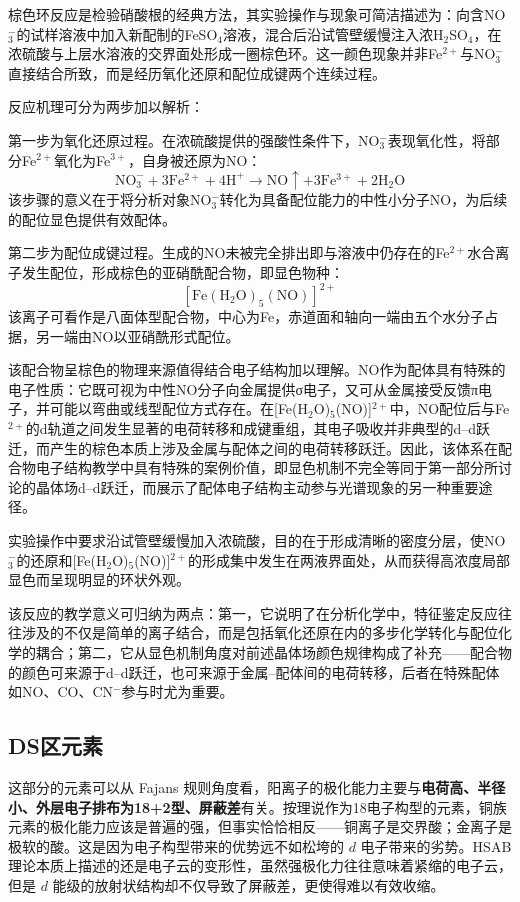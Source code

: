 \documentclass[UTF8]{ctexbook}
\begin{document}
棕色环反应是检验硝酸根的经典方法，其实验操作与现象可简洁描述为：向含NO$_3^-$的试样溶液中加入新配制的FeSO$_4$溶液，混合后沿试管壁缓慢注入浓H$_2$SO$_4$，在浓硫酸与上层水溶液的交界面处形成一圈棕色环。这一颜色现象并非Fe$^{2+}$与NO$_3^-$直接结合所致，而是经历氧化还原和配位成键两个连续过程。

反应机理可分为两步加以解析：

第一步为氧化还原过程。在浓硫酸提供的强酸性条件下，NO$_3^-$表现氧化性，将部分Fe$^{2+}$氧化为Fe$^{3+}$，自身被还原为NO：
\[
\mathrm{NO_3^- + 3Fe^{2+} + 4H^+ \rightarrow NO\uparrow + 3Fe^{3+} + 2H_2O}
\]
该步骤的意义在于将分析对象NO$_3^-$转化为具备配位能力的中性小分子NO，为后续的配位显色提供有效配体。

第二步为配位成键过程。生成的NO未被完全排出即与溶液中仍存在的Fe$^{2+}$水合离子发生配位，形成棕色的亚硝酰配合物，即显色物种：
\[
\mathrm{[Fe(H_2O)_5(NO)]^{2+}}
\]
该离子可看作是八面体型配合物，中心为Fe，赤道面和轴向一端由五个水分子占据，另一端由NO以亚硝酰形式配位。

该配合物呈棕色的物理来源值得结合电子结构加以理解。NO作为配体具有特殊的电子性质：它既可视为中性NO分子向金属提供σ电子，又可从金属接受反馈π电子，并可能以弯曲或线型配位方式存在。在[Fe(H$_2$O)$_5$(NO)]$^{2+}$中，NO配位后与Fe$^{2+}$的d轨道之间发生显著的电荷转移和成键重组，其电子吸收并非典型的d--d跃迁，而产生的棕色本质上涉及金属与配体之间的电荷转移跃迁。因此，该体系在配合物电子结构教学中具有特殊的案例价值，即显色机制不完全等同于第一部分所讨论的晶体场d--d跃迁，而展示了配体电子结构主动参与光谱现象的另一种重要途径。

实验操作中要求沿试管壁缓慢加入浓硫酸，目的在于形成清晰的密度分层，使NO$_3^-$的还原和[Fe(H$_2$O)$_5$(NO)]$^{2+}$的形成集中发生在两液界面处，从而获得高浓度局部显色而呈现明显的环状外观。

该反应的教学意义可归纳为两点：第一，它说明了在分析化学中，特征鉴定反应往往涉及的不仅是简单的离子结合，而是包括氧化还原在内的多步化学转化与配位化学的耦合；第二，它从显色机制角度对前述晶体场颜色规律构成了补充——配合物的颜色可来源于d--d跃迁，也可来源于金属--配体间的电荷转移，后者在特殊配体如NO、CO、CN$^-$参与时尤为重要。

\newpage

\subsection{DS区元素}

这部分的元素可以从 Fajans 规则角度看，阳离子的极化能力主要与\textbf{电荷高、半径小、外层电子排布为18+2型、屏蔽差}有关。按理说作为18电子构型的元素，铜族元素的极化能力应该是普遍的强，但事实恰恰相反——铜离子是交界酸；金离子是极软的酸。这是因为电子构型带来的优势远不如松垮的 $d$ 电子带来的劣势。HSAB 理论本质上描述的还是电子云的变形性，虽然强极化力往往意味着紧缩的电子云，但是 $d$ 能级的放射状结构却不仅导致了屏蔽差，更使得难以有效收缩。
\end{document}
